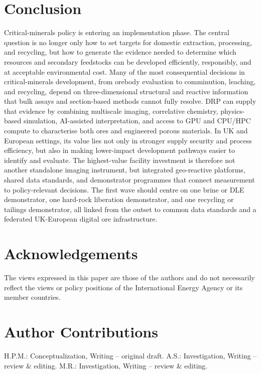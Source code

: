 \documentclass[12pt,a4paper]{article}
\begin{document}
\section{Conclusion}
Critical-minerals policy is entering an implementation phase. The central question is no longer only how to set targets for domestic extraction, processing, and recycling, but how to generate the evidence needed to determine which resources and secondary feedstocks can be developed efficiently, responsibly, and at acceptable environmental cost. Many of the most consequential decisions in critical-minerals development, from orebody evaluation to comminution, leaching, and recycling, depend on three-dimensional structural and reactive information that bulk assays and section-based methods cannot fully resolve. DRP can supply that evidence by combining multiscale imaging, correlative chemistry, physics-based simulation, AI-assisted interpretation, and access to GPU and CPU/HPC compute to characterise both ores and engineered porous materials. In UK and European settings, its value lies not only in stronger supply security and process efficiency, but also in making lower-impact development pathways easier to identify and evaluate. The highest-value facility investment is therefore not another standalone imaging instrument, but integrated geo-reactive platforms, shared data standards, and demonstrator programmes that connect measurement to policy-relevant decisions. The first wave should centre on one brine or DLE demonstrator, one hard-rock liberation demonstrator, and one recycling or tailings demonstrator, all linked from the outset to common data standards and a federated UK-European digital ore infrastructure.

\section*{Acknowledgements}
The views expressed in this paper are those of the authors and do not necessarily reflect the views or policy positions of the International Energy Agency or its member countries.

\section*{Author Contributions}
H.P.M.: Conceptualization, Writing -- original draft. A.S.: Investigation, Writing -- review \& editing. M.R.: Investigation, Writing -- review \& editing.
\end{document}
